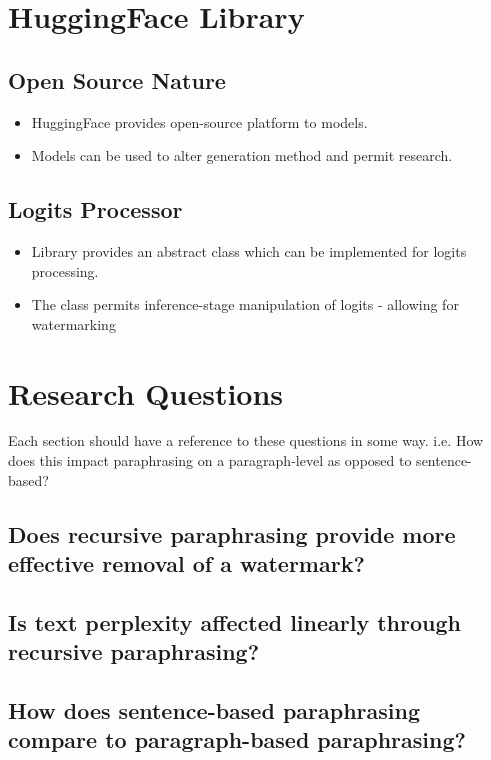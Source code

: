 \documentclass{l4proj}
\theoremstyle{definition}
\begin{document}
\section{HuggingFace Library}
    \subsection{Open Source Nature}
        \begin{itemize}
            \setlength\itemsep{0.5em}
            \item HuggingFace provides open-source platform to models.
            \item Models can be used to alter generation method and permit research.
        \end{itemize}
    \subsection{Logits Processor}
        \begin{itemize}
            \setlength\itemsep{0.5em}
            \item Library provides an abstract class which can be implemented for logits processing.
            \item The class permits inference-stage manipulation of logits - allowing for watermarking
        \end{itemize}

\section{Research Questions}
    Each section should have a reference to these questions in some way. i.e. How does this impact paraphrasing on a paragraph-level as opposed to sentence-based? 
    \subsection{Does recursive paraphrasing provide more effective removal of a watermark?}
    \subsection{Is text perplexity affected linearly through recursive paraphrasing?}
    \subsection{How does sentence-based paraphrasing compare to paragraph-based paraphrasing?}
\end{document}
